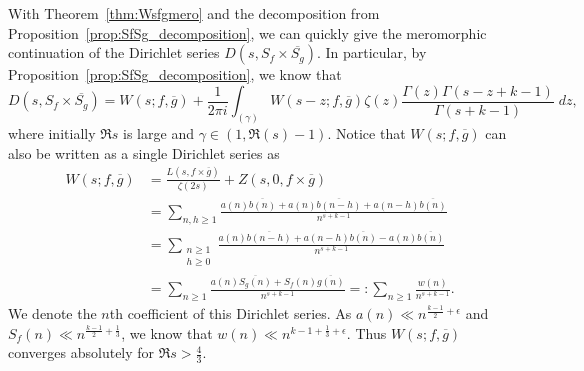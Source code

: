 With Theorem~\ref{thm:Wsfgmero} and the decomposition from
Proposition~\ref{prop:SfSg_decomposition}, we can quickly give the meromorphic
continuation of the Dirichlet series $D(s, S_f \times \overline{S_g})$.
In particular, by Proposition~\ref{prop:SfSg_decomposition}, we know that
\begin{equation}
  D(s, S_f \times \overline{S_g}) = W(s; f, \overline{g}) + \frac{1}{2\pi i}
  \int_{(\gamma)} W(s-z; f, \overline{g}) \zeta(z)\frac{\Gamma(z) \Gamma(s - z + k -
  1)}{\Gamma(s + k - 1)} \; dz,
\end{equation}
where initially $\Re s$ is large and $\gamma \in (1, \Re(s) - 1)$.
Notice that $W(s; f, \overline{g})$ can also be written as a single Dirichlet series as
\begin{align}
  W(s; f, \overline{g}) &= \frac{L(s, f\times \overline{g})}{\zeta(2s)} + Z(s, 0, f\times
  \overline{g}) \\
  &= \sum_{n,h \geq 1} \frac{a(n) \overline{b(n)} + a(n)\overline{b(n-h)} +
  a(n-h)\overline{b(n)}}{n^{s + k - 1}} \\
  &= \sum_{\substack{n \geq 1 \\ h \geq 0}} \frac{a(n)\overline{b(n-h)} +
  a(n-h)\overline{b(n)} - a(n)\overline{b(n)}}{n^{s + k - 1}} \\
  &= \sum_{n \geq 1} \frac{a(n) \overline{S_g(n)} + S_f(n) \overline{g(n)}}{n^{s + k - 1}}
  =: \sum_{n \geq 1} \frac{w(n)}{n^{s + k - 1}}.
\end{align}
We denote the $n$th coefficient of this Dirichlet series.
As $a(n) \ll n^{\frac{k-1}{2} + \epsilon}$ and $S_f(n) \ll n^{\frac{k-1}{2} +
\frac{1}{3}}$, we know that $w(n) \ll n^{k-1 + \frac{1}{3} + \epsilon}$.
Thus $W(s; f, \overline{g})$ converges absolutely for $\Re s > \frac{4}{3}$.

